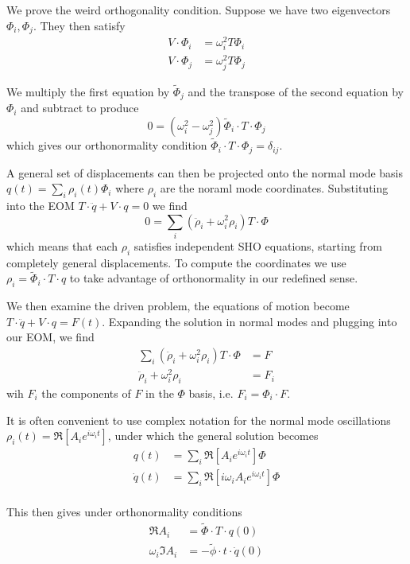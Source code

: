 \documentclass[10pt]{report}
\begin{document}
We prove the weird orthogonality condition. Suppose we have two eigenvectors $\Phi_i, \Phi_j$. They then satisfy
\begin{align*}
    V \cdot \Phi_i &= \omega_i^2 T \Phi_i\\
    V \cdot \Phi_j &= \omega_j^2 T \Phi_j
\end{align*}

We multiply the first equation by $\tilde{\Phi}_j$ and the transpose of the second equation by $\Phi_i$ and subtract to produce
$$0 = \left( \omega_i^2 - \omega_j^2 \right)\tilde{\Phi}_i\cdot T \cdot \Phi_j$$
which gives our orthonormality condition $\tilde{\Phi}_i \cdot T \cdot \Phi_j = \delta_{ij}$. 

A general set of displacements can then be projected onto the normal mode basis $q(t) = \sum_i \rho_i(t) \Phi_i$ where $\rho_i$ are the noraml mode coordinates. Substituting into the EOM $T\cdot \ddot{q} + V\cdot q = 0$ we find
$$0 = \sum_i \left( \ddot{\rho}_i + \omega_i^2\rho_i \right)T\cdot \Phi$$
which means that each $\rho_i$ satisfies independent SHO equations, starting from completely general displacements. To compute the coordinates we use $\rho_i = \tilde{\Phi}_i \cdot T \cdot q$ to take advantage of orthonormality in our redefined sense. 

We then examine the driven problem, the equations of motion become $T \cdot \ddot{q} + V\cdot q = F(t)$. Expanding the solution in normal modes and plugging into our EOM, we find
\begin{align*}
    \sum_i \left( \ddot{\rho}_i + \omega_i^2 \rho_i \right)T\cdot \Phi &= F\\
    \ddot{\rho}_i + \omega_i^2 \rho_i &= F_i
\end{align*}
wih $F_i$ the components of $F$ in the $\Phi$ basis, i.e. $F_i = \Phi_i\cdot F$.

It is often convenient to use complex notation for the normal mode oscillations $\rho_i(t) = \Re\left[ A_i e^{i\omega_i t} \right]$, under which the general solution becomes
\begin{align*}
    q(t) &= \sum_i \Re[A_ie^{i\omega_i t}]\Phi\\
    \dot{q}(t) &= \sum_i \Re[i\omega_i A_ie^{i\omega_i t}]\Phi\\
\end{align*}

This then gives under orthonormality conditions
\begin{align*}
    \Re A_i &= \tilde{\Phi}\cdot T \cdot q(0)\\
    \omega_i \Im A_i &= -\tilde{\phi}\cdot t \cdot \dot{q}(0)
\end{align*}
\end{document}
